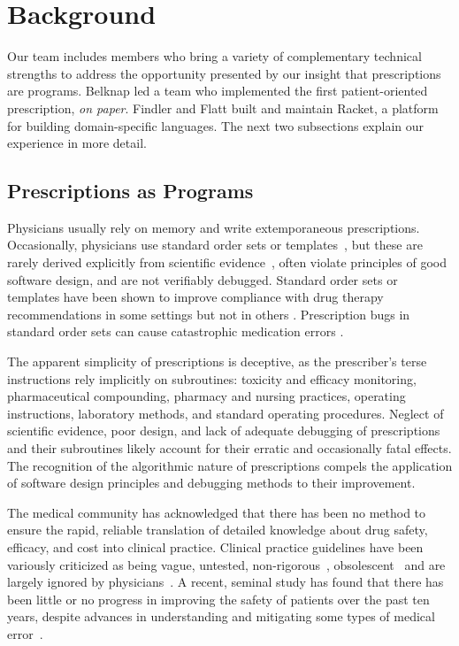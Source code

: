 \section{Background}

Our team includes members who bring a variety of complementary
technical strengths to address the opportunity presented by our
insight that prescriptions are programs. Belknap led a team who
implemented the first patient-oriented prescription, \emph{on
  paper}. Findler and Flatt built and maintain Racket, a platform for
building domain-specific languages. The next two subsections explain
our experience in more detail.

\subsection{Prescriptions as Programs}\label{sec:pap}

Physicians usually rely on memory and write extemporaneous
prescriptions. Occasionally, physicians use standard order sets or
templates~\citep{Elsberry1978,Honda1979,Kowalsky1982}, but these are
rarely derived explicitly from scientific
evidence~\citep{Fonarow2007,Dranitsaris2001}, often violate principles
of good software design, and are not verifiably debugged. Standard
order sets or templates have been shown to improve compliance with
drug therapy recommendations in some settings \citep{Girotti1990} but not in
others \citep{Aswapokee1992}. Prescription bugs in standard order sets can cause
catastrophic medication errors \citep{Cohen1992}.

The apparent simplicity of prescriptions is deceptive, as the
prescriber's terse instructions rely implicitly on subroutines:
toxicity and efficacy monitoring, pharmaceutical compounding, pharmacy
and nursing practices, operating instructions, laboratory methods, and
standard operating procedures. Neglect of scientific evidence, poor
design, and lack of adequate debugging of prescriptions and their
subroutines likely account for their erratic and occasionally fatal
effects. The recognition of the algorithmic nature of prescriptions
compels the application of software design principles and debugging
methods to their improvement.

The medical community has acknowledged that there has been no method
to ensure the rapid, reliable translation of detailed knowledge about
drug safety, efficacy, and cost into clinical practice. Clinical
practice guidelines have been variously criticized as being vague,
untested, non-rigorous~\citep{Weingarten1997},
obsolescent~\citep{Shekelle2001} and are largely ignored by
physicians~\citep{Cabana1999}. A recent, seminal study has found that
there has been little or no progress in improving the safety of
patients over the past ten years, despite advances in understanding
and mitigating some types of medical error~\citep{Landrigan2010}.

